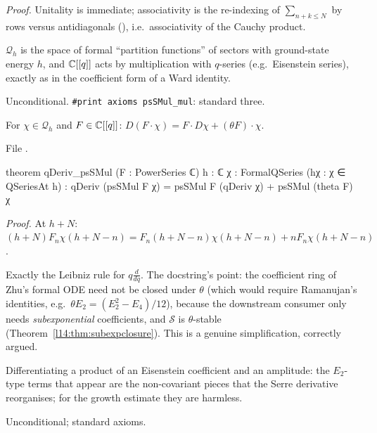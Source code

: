 \noindent\emph{Proof.} Unitality is immediate; associativity is the re-indexing of $\sum_{n+k\le N}$ by rows versus
antidiagonals (), i.e.\ associativity of the Cauchy product.
\begin{physics}
$\mathcal Q_h$ is the space of formal ``partition functions'' of sectors with ground-state energy $h$, and ${\mathbb{C}}[[q]]$ acts by
multiplication with $q$-series (e.g.\ Eisenstein series), exactly as in the coefficient form of a Ward identity.
\end{physics}
\begin{status}
Unconditional. \texttt{\#print axioms psSMul\_mul}: standard three.
\end{status}

\begin{theorem}\label{l14:thm:productrule}
For $\chi\in\mathcal Q_h$ and $F\in{\mathbb{C}}[[q]]$: $D(F\cdot\chi) = F\cdot D\chi + (\theta F)\cdot\chi$.
\end{theorem}
\noindent File .
\begin{leancode}
theorem qDeriv_psSMul (F : PowerSeries ℂ) {h : ℂ} {χ : FormalQSeries} (hχ : χ ∈ QSeriesAt h) :
    qDeriv (psSMul F χ) = psSMul F (qDeriv χ) + psSMul (theta F) χ
\end{leancode}
\noindent\emph{Proof.} At $h+N$: $(h+N)F_n\chi(h+N-n) = F_n(h+N-n)\chi(h+N-n) + nF_n\chi(h+N-n)$.
\begin{dictionary}
Exactly the Leibniz rule for $q\frac d{dq}$. The docstring's point: the coefficient ring of Zhu's formal ODE need not be
closed under $\theta$ (which would require Ramanujan's identities, e.g.\ $\theta E_2 = (E_2^2-E_4)/12$), because the
downstream consumer only needs \emph{subexponential} coefficients, and $\mathcal S$ is $\theta$-stable
(Theorem~\ref{l14:thm:subexpclosure}). This is a genuine simplification, correctly argued.
\end{dictionary}
\begin{physics}
Differentiating a product of an Eisenstein coefficient and an amplitude: the $E_2$-type terms that appear are the
non-covariant pieces that the Serre derivative reorganises; for the growth estimate they are harmless.
\end{physics}
\begin{status}
Unconditional; standard axioms.
\end{status}

